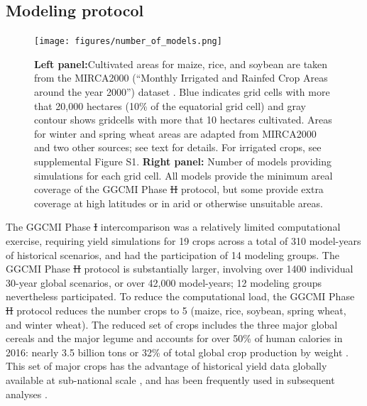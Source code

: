\documentclass[gmd, manuscript]{copernicus} %
\providecommand{\DIFadd}[1]{{\protect\color{blue}\uwave{#1}}} %
\providecommand{\DIFdel}[1]{{\protect\color{red}\sout{#1}}}                      %
\providecommand{\DIFaddbegin}{} %
\providecommand{\DIFaddend}{} %
\providecommand{\DIFdelbegin}{} %
\providecommand{\DIFdelend}{} %
\providecommand{\DIFaddFL}[1]{\DIFadd{#1}} %
\providecommand{\DIFdelFL}[1]{\DIFdel{#1}} %
\providecommand{\DIFaddbeginFL}{} %
\providecommand{\DIFaddendFL}{} %
\providecommand{\DIFdelbeginFL}{} %
\providecommand{\DIFdelendFL}{} %
\begin{document}
\subsection{Modeling protocol}
\begin{figure}[ht]
  \centering
  \texttt{[image: figures/number\_of\_models.png]}
  \caption{
  \textbf{Left panel:}Cultivated areas for maize, rice, and soybean are taken from the MIRCA2000 (``Monthly Irrigated and Rainfed Crop Areas around the year 2000'') dataset \citep{Portmann2010}. Blue indicates grid cells with more that 20,000 hectares (10\% of the equatorial grid cell) and gray contour shows gridcells with more that 10 hectares cultivated. 
  Areas for winter and spring wheat areas are adapted from MIRCA2000 and two other sources; see text for details.  For irrigated crops, see supplemental Figure S1.
  \textbf{Right panel:} Number of models providing simulations for each grid cell.  
  All models provide the minimum areal coverage of the GGCMI Phase \DIFdelbeginFL \DIFdelFL{II }\DIFdelendFL \DIFaddbeginFL \DIFaddFL{2 }\DIFaddendFL protocol, but some provide extra coverage at high latitudes or in arid or otherwise unsuitable areas.}
  \label{fig:crop_area}
\end{figure}

The GGCMI Phase \DIFdelbegin \DIFdel{I }\DIFdelend \DIFaddbegin \DIFadd{1 }\DIFaddend intercomparison was a relatively limited computational exercise, requiring yield simulations for 19 crops across a total of 310 model-years of historical scenarios, and had the participation of 14 modeling groups.
The GGCMI Phase \DIFdelbegin \DIFdel{II }\DIFdelend \DIFaddbegin \DIFadd{2 }\DIFaddend protocol is substantially larger, involving over 1400 individual 30-year global scenarios, or over 42,000 model-years; 12 modeling groups nevertheless participated. To reduce the computational load, the GGCMI Phase \DIFdelbegin \DIFdel{II }\DIFdelend \DIFaddbegin \DIFadd{2 }\DIFaddend protocol reduces the number crops to 5 (maize, rice, soybean, spring wheat, and winter wheat). 
The reduced set of crops includes the three major global cereals and the major legume and accounts for over 50\% of human calories in 2016: nearly 3.5 billion tons or 32\% of total global crop production by weight \citep{FAOSTAT}. 
This set of major crops has the advantage of historical yield data globally available at sub-national scale \citep{Ray2012,iizumi_historical_2014}, and has been frequently used in subsequent analyses \citep[e.g.][]{muller_global_2017,porwollik_spatial_2016}.
\end{document}
